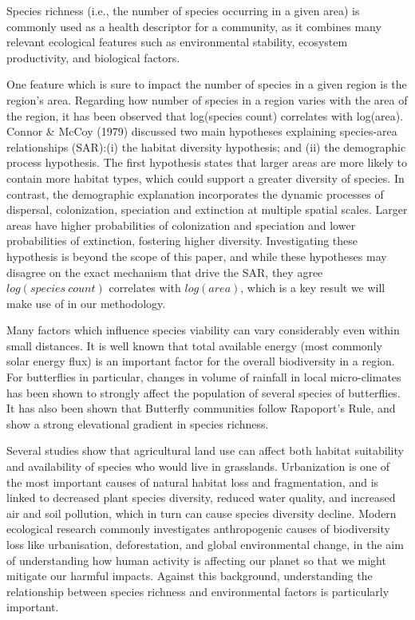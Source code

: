 \documentclass[prl,showpacs,superscriptaddress,twocolumn,longbibliography]{revtex4-1}
\begin{document}
Species richness (i.e., the number of species occurring in a given area) is commonly used as a health descriptor for a community, as it combines many relevant ecological features such as environmental stability, ecosystem productivity, and biological factors\cite{Park2003}.

One feature which is sure to impact the number of species in a given region is the region's area. Regarding how number of species in a region varies with the area of the region, it has been observed that log(species count) correlates with log(area)\cite{connor_2001_sar}. Connor \& McCoy (1979) discussed two main hypotheses explaining species-area relationships (SAR):(i) the habitat diversity hypothesis; and (ii) the demographic process hypothesis. The first hypothesis states that larger areas are more likely to contain more habitat types, which could support a greater diversity of species. In contrast, the demographic explanation incorporates the dynamic processes of dispersal, colonization, speciation and extinction at multiple spatial scales. Larger areas have higher probabilities of colonization and speciation and lower probabilities of extinction, fostering higher diversity\cite{Drakare2006}.  Investigating these hypothesis is beyond the scope of this paper, and while these hypotheses may disagree on the exact mechanism that drive the SAR, they agree $log(species \: count)$ correlates with $log(area)$, which is a key result we will make use of in our methodology.

Many factors which influence species viability can vary considerably even within small distances\cite{john_wiley__sons_ltd_species_2007}. It is well known that total available energy (most commonly solar energy flux) is an important factor for the overall biodiversity in a region\cite{hawkins_energy_2003, currie_energy_1991}. For butterflies in particular, changes in volume of rainfall in local micro-climates has been shown to strongly affect the population of several species of butterflies\cite{Haneda2019}. It has also been shown that Butterfly communities follow Rapoport's Rule, and show a strong elevational gradient in species richness\cite{Fleishman1998, Arturo}. 

Several studies show that agricultural land use can affect both habitat suitability and availability of species who would live in grasslands\cite{smith}. Urbanization is one of the most important causes of natural habitat loss and fragmentation, and is linked to decreased plant species diversity, reduced water quality, and increased air and soil pollution, which in turn can cause species diversity decline\cite{smith,Tzortzakaki2019}. 
Modern ecological research commonly investigates anthropogenic causes of biodiversity loss like urbanisation, deforestation, and global environmental change, in the aim of understanding how human activity is affecting our planet so that we might mitigate our harmful impacts\cite{hill_responses_2002, munguira_conservation_1995, white_human_2007, sanchez-bayo_worldwide_2019}. Against this background, understanding the relationship between species richness and environmental factors is particularly important. 
\end{document}
